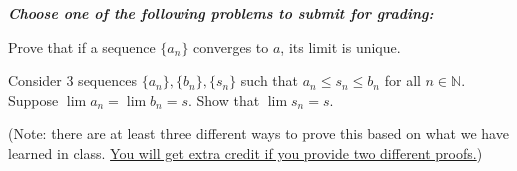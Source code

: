 \documentclass{ximera}
\begin{document}
   \textit{\textbf{Choose one of the following problems to submit for grading:}}
    \begin{exercise}
        Prove that if a sequence $\{a_n\}$ converges to $a$, its limit is unique.
    \end{exercise}

    \begin{exercise}
        Consider 3 sequences $\{a_n\}, \{b_n\}, \{s_n\}$ such that $a_n\leq s_n\leq b_n$ for all $n \in \mathbb{N}$.  Suppose $\lim a_n = \lim b_n =s$.  Show that $\lim s_n = s$.  
        
        (Note: there are at least three different ways to prove this based on what we have learned in class. \underline{You will get extra credit if you provide two different proofs.})
    \end{exercise}
\end{document}
